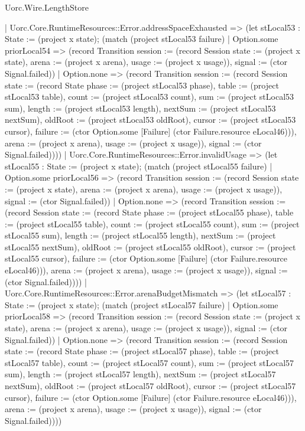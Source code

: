 \begin{lexlean}{Uorc.Wire.LengthStore}
\begin{semanticmodule}
{      | Uorc.Core.RuntimeResources::Error.addressSpaceExhausted => (let stLocal53 : State := (project x state); (match (project stLocal53 failure)
        | Option.some priorLocal54 => (record Transition {session := (record Session {state := (project x state), arena := (project x arena), usage := (project x usage)}), signal := (ctor Signal.failed)})
        | Option.none => (record Transition {session := (record Session {state := (record State {phase := (project stLocal53 phase), table := (project stLocal53 table), count := (project stLocal53 count), sum := (project stLocal53 sum), length := (project stLocal53 length), nextSum := (project stLocal53 nextSum), oldRoot := (project stLocal53 oldRoot), cursor := (project stLocal53 cursor), failure := (ctor Option.some [Failure] (ctor Failure.resource eLocal46))}), arena := (project x arena), usage := (project x usage)}), signal := (ctor Signal.failed)})))
      | Uorc.Core.RuntimeResources::Error.invalidUsage => (let stLocal55 : State := (project x state); (match (project stLocal55 failure)
        | Option.some priorLocal56 => (record Transition {session := (record Session {state := (project x state), arena := (project x arena), usage := (project x usage)}), signal := (ctor Signal.failed)})
        | Option.none => (record Transition {session := (record Session {state := (record State {phase := (project stLocal55 phase), table := (project stLocal55 table), count := (project stLocal55 count), sum := (project stLocal55 sum), length := (project stLocal55 length), nextSum := (project stLocal55 nextSum), oldRoot := (project stLocal55 oldRoot), cursor := (project stLocal55 cursor), failure := (ctor Option.some [Failure] (ctor Failure.resource eLocal46))}), arena := (project x arena), usage := (project x usage)}), signal := (ctor Signal.failed)})))
      | Uorc.Core.RuntimeResources::Error.arenaBudgetMismatch => (let stLocal57 : State := (project x state); (match (project stLocal57 failure)
        | Option.some priorLocal58 => (record Transition {session := (record Session {state := (project x state), arena := (project x arena), usage := (project x usage)}), signal := (ctor Signal.failed)})
        | Option.none => (record Transition {session := (record Session {state := (record State {phase := (project stLocal57 phase), table := (project stLocal57 table), count := (project stLocal57 count), sum := (project stLocal57 sum), length := (project stLocal57 length), nextSum := (project stLocal57 nextSum), oldRoot := (project stLocal57 oldRoot), cursor := (project stLocal57 cursor), failure := (ctor Option.some [Failure] (ctor Failure.resource eLocal46))}), arena := (project x arena), usage := (project x usage)}), signal := (ctor Signal.failed)})))
}
\end{semanticmodule}
\end{lexlean}
